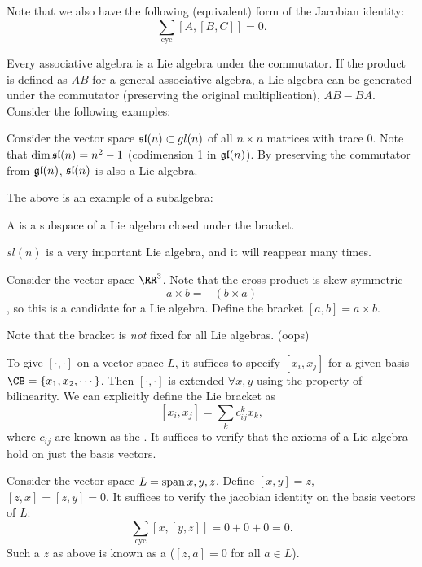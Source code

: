 Note that we also have the following (equivalent) form of the Jacobian identity: 
\[ \sum_{\text{cyc}} [A,[B,C]] = 0. \] 

Every associative algebra is a Lie algebra under the commutator. If the product is defined as $AB$ for a general associative algebra, a Lie algebra can be generated under the commutator (preserving the original multiplication), $AB - BA$. 
Consider the following examples:
\begin{example}
Consider the vector space $\frak{sl}(n) \subset gl(n)$ of all $n \times n$ matrices with trace 0. Note that $\dim{\frak{sl}(n)} = n^2 - 1$ (codimension 1 in $\frak{gl}(n)$). By preserving the commutator from $\frak{gl}(n)$, $\frak{sl}(n)$ is also a Lie algebra. 
\end{example}

The above is an example of a subalgebra:
\begin{definition}
A  is a subspace of a Lie algebra closed under the bracket. 
\end{definition}
 $sl(n)$ is a very important Lie algebra, and it will reappear many times. 

 \begin{example}
 Consider the vector space $\RR^3$. Note that the cross product is skew symmetric  \[ a\times b = -(b \times a) \] , so this is a candidate for a Lie algebra. Define the bracket $[a,b] = a\times b$. 
 \end{example}

 Note that the bracket is \emph{not} fixed for all Lie algebras. (oops)

 \begin{remark*}
 To give $[\cdot, \cdot]$ on a vector space $L$, it suffices to specify $[x_i, x_j]$ for a given basis $\CB = \{x_1, x_2, \cdots \}$. Then $[\cdot, \cdot]$ is extended $\forall x, y$ using the property of bilinearity. 
 We can explicitly define the Lie bracket as 
 \[ [x_i, x_j] = \sum_k c^k_{ij} x_k, \] where $c_{ij}$ are known as the . It suffices to verify that the axioms of a Lie algebra hold on just the basis vectors. 
 \end{remark*}

\begin{example}
Consider the vector space $L = \operatorname{span}{x,y,z}$. Define $[x,y] = z$, $[z,x] = [z,y] = 0$. It suffices to verify the jacobian identity on the basis vectors of $L$: 
\[ \sum_{\text{cyc}} [x,[y,z]] = 0 + 0 + 0 = 0. \]  Such a $z$ as above is known as a  ($[z,a] = 0$ for all $a \in L$). 
\end{example}

